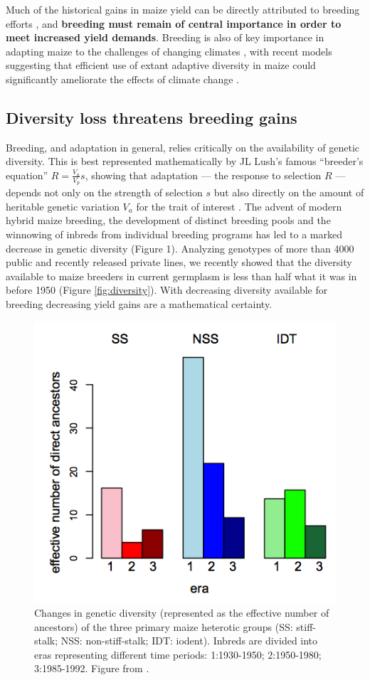 \documentclass[12pt]{article}
\begin{document}
Much of the historical gains in maize yield can be directly attributed to breeding efforts \citep{Duvick1992, duvick2005genetic}, and {\bf breeding must remain of central importance in order to meet increased yield demands}.  
Breeding is also of key importance in adapting maize to the challenges of changing climates \citep{Troyer2004a}, with recent models suggesting that efficient use of extant adaptive diversity in maize could significantly ameliorate the effects of climate change \citep{butler2013adaptation}.   

\subsection*{Diversity loss threatens breeding gains}

Breeding, and adaptation in general, relies critically on the availability of genetic diversity. 
This is best represented mathematically by JL Lush's famous ``breeder's equation'' $R=\frac{V_a}{V_p}s$, showing that adaptation --- the response to selection $R$ --- depends not only on the strength of selection $s$ but also directly on the amount of heritable genetic variation $V_a$ for the trait of interest \citep{kelly2011breeder}. 
The advent of modern hybrid maize breeding, the development of distinct breeding pools and the winnowing of inbreds from individual breeding programs has led to a marked decrease in genetic diversity (Figure 1). 
Analyzing genotypes of more than 4000 public and recently released private lines, we recently showed that the diversity available to maize breeders in current germplasm is less than half what it was in before 1950 (Figure \ref{fig:diversity}). 
With decreasing diversity available for breeding decreasing yield gains are a mathematical certainty. 

\begin{figure}
\includegraphics[width=0.5\linewidth]{joost_diversity.png}
\caption{Changes in genetic diversity (represented as the effective number of ancestors) of the three primary maize heterotic groups (SS: stiff-stalk; NSS: non-stiff-stalk; IDT: iodent). Inbreds are divided into eras representing different time periods: 1:1930-1950; 2:1950-1980; 3:1985-1992. Figure from \citet{van2012historical}.} 
\label{diversity}
\end{figure}
\end{document}
